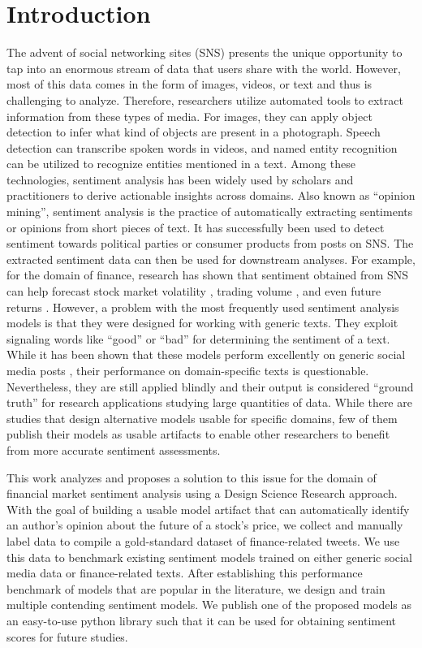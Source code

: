 \section{Introduction}

The advent of social networking sites (SNS) presents the unique opportunity to tap into an enormous stream of data that users share with the world. However, most of this data comes in the form of images, videos, or text and thus is challenging to analyze. Therefore, researchers utilize automated tools to extract information from these types of media. For images, they can apply object detection to infer what kind of objects are present in a photograph. Speech detection can transcribe spoken words in videos, and named entity recognition can be utilized to recognize entities mentioned in a text. Among these technologies, sentiment analysis has been widely used by scholars and practitioners to derive actionable insights across domains. Also known as ``opinion mining'', sentiment analysis is the practice of automatically extracting sentiments or opinions from short pieces of text. It has successfully been used to detect sentiment towards political parties  or consumer products \cite{pontiki2016semeval} from posts on SNS. The extracted sentiment data can then be used for downstream analyses. For example, for the domain of finance, research has shown that sentiment obtained from SNS can help forecast stock market volatility , trading volume , and even future returns . However, a problem with the most frequently used sentiment analysis models is that they were designed for working with generic texts. They exploit signaling words like ``good'' or ``bad'' for determining the sentiment of a text. While it has been shown that these models perform excellently on generic social media posts \cite{al2020evaluating}, their performance on domain-specific texts is questionable. Nevertheless, they are still applied blindly and their output is considered ``ground truth'' for research applications studying large quantities of data. While there are studies that design alternative models usable for specific domains, few of them publish their models as usable artifacts to enable other researchers to benefit from more accurate sentiment assessments.

This work analyzes and proposes a solution to this issue for the domain of financial market sentiment analysis using a Design Science Research approach. With the goal of building a usable model artifact that can automatically identify an author's opinion about the future of a stock's price, we collect and manually label data to compile a gold-standard dataset of finance-related tweets. We use this data to benchmark existing sentiment models trained on either generic social media data or finance-related texts. After establishing this performance benchmark of models that are popular in the literature, we design and train multiple contending sentiment models. We publish one of the proposed models as an easy-to-use python library such that it can be used for obtaining sentiment scores for future studies.

